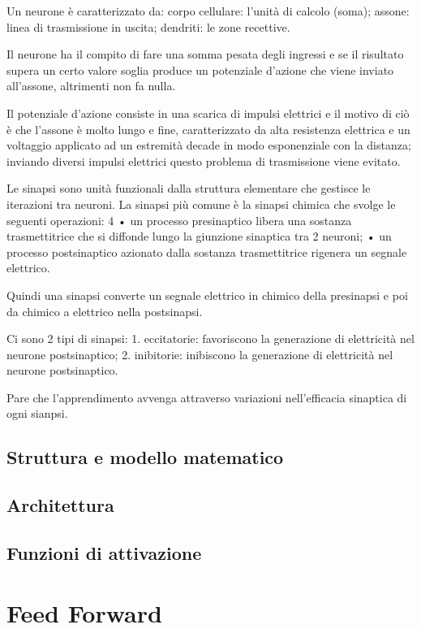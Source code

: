 \documentclass[12pt,a4paper,oneside]{book}
\begin{document}
		Un neurone è caratterizzato da:
		corpo cellulare: l'unità di calcolo (soma); 
		assone: linea di trasmissione in uscita; 
		dendriti: le zone recettive. 
		
		Il neurone ha il compito di fare una somma pesata degli ingressi e se il risultato supera un certo valore soglia produce un potenziale d'azione che viene inviato all'assone, altrimenti non fa nulla. 
		
		Il potenziale d'azione consiste in una scarica di impulsi elettrici e il motivo di ciò è che l'assone è molto lungo e fine, caratterizzato da alta resistenza elettrica e un voltaggio applicato ad un estremità decade in modo esponenziale con la distanza; inviando diversi impulsi elettrici questo problema di trasmissione viene evitato. 
		
		Le sinapsi sono unità funzionali dalla struttura elementare che gestisce le iterazioni tra neuroni. La sinapsi più comune è la sinapsi chimica che svolge le seguenti operazioni: 
		4
		• un processo presinaptico libera una sostanza trasmettitrice che si diffonde lungo la giunzione sinaptica tra 2 neuroni; • un processo postsinaptico azionato dalla sostanza trasmettitrice rigenera un segnale elettrico. 
		
		Quindi una sinapsi converte un segnale elettrico in chimico della presinapsi e poi da chimico a elettrico nella postsinapsi. 
		
		Ci sono 2 tipi di sinapsi: 1. eccitatorie: favoriscono la generazione di elettricità nel neurone postsinaptico; 2. inibitorie: inibiscono la generazione di elettricità nel neurone postsinaptico. 
		
		Pare che l'apprendimento avvenga attraverso variazioni nell'efficacia sinaptica di ogni sianpsi. 
		
		
		
		\section{Struttura e modello matematico}
		\section{Architettura}
		\section{Funzioni di attivazione}
	
	\chapter{Feed Forward}
\end{document}
